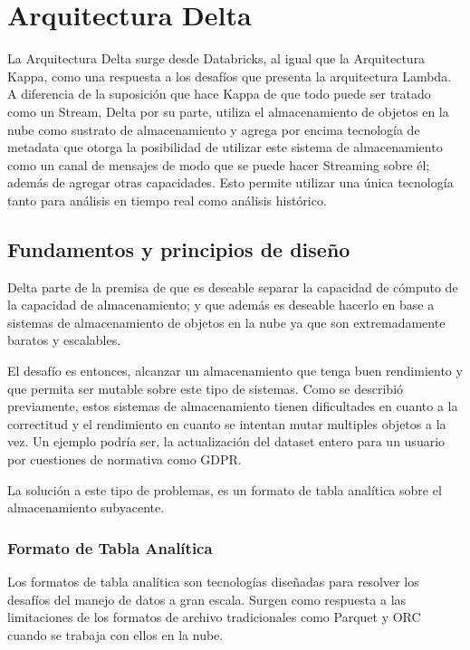 \section{Arquitectura Delta}


La Arquitectura Delta surge desde Databricks, al igual que la Arquitectura Kappa, 
como una respuesta a los desafíos que presenta la arquitectura Lambda.
A diferencia de la suposición que hace Kappa de que todo puede ser tratado como un Stream, 
Delta por su parte, utiliza el almacenamiento de objetos en la nube como sustrato de almacenamiento y 
agrega por encima tecnología de metadata que otorga la posibilidad de utilizar este sistema de almacenamiento
como un canal de mensajes de modo que se puede hacer Streaming sobre él; además de agregar otras capacidades.
Esto permite utilizar una única tecnología tanto para análisis en tiempo real como análisis histórico. 


\subsection{Fundamentos y principios de diseño}

Delta parte de la premisa de que es deseable separar la capacidad de cómputo de la capacidad de almacenamiento; 
y que además es deseable hacerlo en base a sistemas de almacenamiento de objetos en la nube ya que son extremadamente
baratos y escalables. 

El desafío es entonces, alcanzar un almacenamiento que tenga buen rendimiento y que permita ser mutable sobre
este tipo de sistemas. Como se describió previamente, estos sistemas de almacenamiento tienen dificultades
en cuanto a la correctitud y el rendimiento en cuanto se intentan mutar multiples objetos a la vez. Un ejemplo
podría ser, la actualización del dataset entero para un usuario por cuestiones de normativa como GDPR.

La solución a este tipo de problemas, es un formato de tabla analítica sobre el almacenamiento subyacente. 


\subsubsection{Formato de Tabla Analítica}

Los formatos de tabla analítica son tecnologías diseñadas para resolver los desafíos del manejo de datos
a gran escala. Surgen como respuesta a las limitaciones de los formatos de archivo tradicionales como Parquet y ORC
cuando se trabaja con ellos en la nube. 

